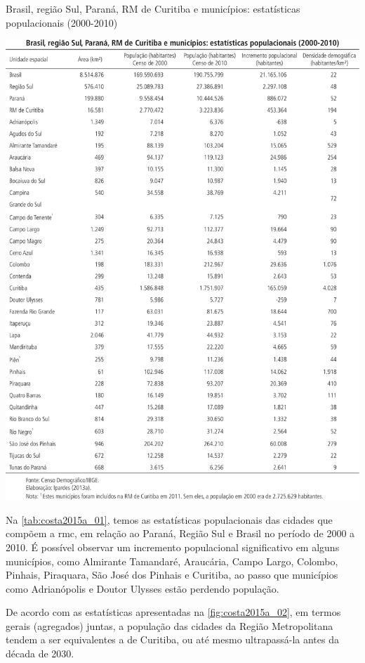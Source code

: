 	\begin{table}
		\centering
		\caption{Brasil, região Sul, Paraná, RM de Curitiba e municípios: estatísticas populacionais (2000-2010)}
		\includegraphics[width=1.0\linewidth]{img/costa2015a_01}
		\label{tab:costa2015a_01}
	\end{table}
	
	Na \autoref{tab:costa2015a_01}, temos as estatísticas populacionais das cidades que compõem a \glsdesc{rmc}, em relação ao Paraná, Região Sul e Brasil no período de 2000 a 2010. É possível observar um incremento populacional significativo em alguns municípios, como Almirante Tamandaré, Araucária, Campo Largo, Colombo, Pinhais, Piraquara, São José dos Pinhais e Curitiba, ao passo que municípios como Adrianópolis e Doutor Ulysses estão perdendo população. 
	
	De acordo com as estatísticas apresentadas na \autoref{fig:costa2015a_02}, em termos gerais (agregados) juntas, a população das cidades da Região Metropolitana tendem a ser equivalentes a de Curitiba, ou até mesmo ultrapassá-la antes da década de 2030.
	
